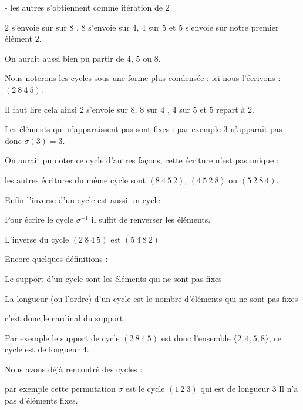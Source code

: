 \change

  - les autres s'obtiennent comme itération de $2$ 

\change

$2$ s'envoie sur sur $8$ , $8$ s'envoie sur $4$, $4$ sur $5$
et $5$ s'envoie sur notre premier élément $2$.

On aurait aussi bien pu partir de $4$, $5$ ou $8$.

\change

Nous noterons les cycles sous une forme plus condensée :
ici nous l'écrivons : $(2\ 8\ 4\ 5)$.

\change

Il faut lire cela ainsi $2$ s'envoie sur $8$, $8$ sur $4$ , $4$ sur $5$
et $5$ repart à $2$.

Les éléments qui n'apparaissent pas sont fixes : par exemple $3$ n’apparaît
pas donc $\sigma(3)=3$.

\change

On aurait pu  noter ce cycle d'autres façons, cette écriture n'est pas unique :

les autres écritures du même cycle sont $(8\ 4\ 5\ 2)$, $(4\ 5\ 2\ 8)$ ou $(5\ 2\ 8\ 4)$.

\change

Enfin l'inverse d'un cycle est aussi un cycle.

Pour écrire le cycle $\sigma^{-1}$ il suffit de renverser les éléments.

L'inverse du cycle $(2\ 8\ 4\ 5)$ est $(5\ 4\ 8\ 2)$  


\diapo

Encore quelques définitions :

Le support d'un cycle sont les éléments qui ne sont pas fixes 

\change

La longueur (ou l'ordre) d'un cycle est le nombre d'éléments qui ne sont pas fixes

c'est donc le cardinal du support.

\change

Par exemple le support de cycle $(2\ 8\ 4\ 5)$ est donc 
l'ensemble $\{2, 4, 5, 8\}$, ce cycle est de longueur $4$.

\change

Nous avons déjà rencontré des cycles :

par exemple cette permutation $\sigma$ est le cycle $(1\ 2\ 3)$ 
qui est de longueur $3$ 
Il n'a pas d'éléments fixes.

